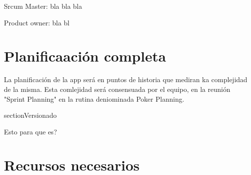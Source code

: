 \documentclass[../pfc.tex]{subfiles}
\begin{document}
	Srcum Master: bla bla bla
	
	Product  owner: bla bl
	
	\section{Planificaación completa}
	
	La planificación de la app será en puntos de historia que mediran ka complejidad de la misma. Esta comlejidad será consensuada por el equipo, en la reunión "Sprint Planning" en la rutina deniominada Poker Planning.  
	
	section{Versionado}
	
	Esto para que es?
	
	\section{Recursos necesarios}


	
\end{document}
